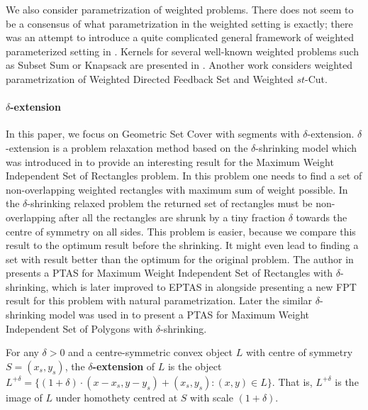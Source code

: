 We also consider parametrization of weighted problems.
There does not seem to be a consensus of what parametrization
in the weighted setting is exactly; there
was an attempt to introduce a quite complicated general
framework of weighted parameterized setting in \cite{weighted_framework}.
Kernels for several well-known weighted problems
such as Subset Sum or Knapsack are presented in \cite{kernel_weighted}.
Another work \cite{weighted_flow} considers weighted
parametrization of Weighted Directed Feedback Set and Weighted $st$-Cut.

\paragraph{$\delta$-extension}
In this paper, we focus on Geometric Set Cover with segments with $\delta$-extension.
$\delta$-extension is a problem relaxation method based on the
$\delta$-shrinking model which was introduced in \cite{shrinking_original}
to provide an interesting result for
the Maximum Weight Independent Set of Rectangles problem.
In this problem one needs to find a set of non-overlapping
weighted rectangles with maximum sum of weight possible.
In the $\delta$-shrinking relaxed problem
the returned set of rectangles must be non-overlapping
after all the rectangles are shrunk by a tiny fraction $\delta$
towards the centre of symmetry on all sides.
This problem is easier, because we compare this result
to the optimum result before the shrinking. It might
even lead to finding a set with result better than the optimum
for the original problem.
The author in \cite{shrinking_original} presents a PTAS
for Maximum Weight Independent Set of Rectangles with $\delta$-shrinking,
which is later improved to EPTAS in \cite{shrinking1} alongside
presenting a new FPT result for this problem with natural parametrization.
Later the similar $\delta$-shrinking model was used in \cite{shrinking2}
to present a PTAS for
Maximum Weight Independent Set of Polygons with $\delta$-shrinking.

\begin{defi}
\label{definition:delta_extension}
For any $\delta > 0$ and a centre-symmetric convex object $L$ with
centre of symmetry $S = (x_s, y_s)$,
the \textbf{$\delta$-extension} of $L$ is the object $L^{+\delta} =
\{(1 + \delta)\cdot(x - x_s, y - y_s) + (x_s, y_s) : (x, y) \in L\}$.
That is, $L^{+\delta}$ is the image of $L$ under homothety centred
at $S$ with scale $(1+\delta)$.
\end{defi}

